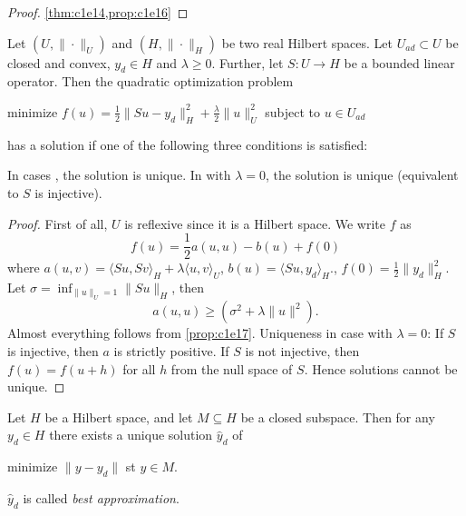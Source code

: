 \documentclass[../skript.tex]{subfiles}
\begin{document}
\begin{proof}
\cref{thm:c1e14,prop:c1e16}
\end{proof}
\begin{theorem} %
\label{thm:c1e18}
Let $(U, \| \cdot \|_U)$ and $(H, \| \cdot \|_H)$ be two real Hilbert spaces. Let $U_{ad} \subset U$ be closed and convex, $y_d \in H$ and $\lambda \geq 0$.
Further, let $S : U \to H$ be a bounded linear operator. Then the quadratic optimization problem\par
\begin{mdframed}[style=theoremframing]
minimize $f(u) = \frac{1}{2} \| Su - y_d \|_H^2 + \frac{\lambda}{2} \| u \|_U^2$ subject to $u \in U_{ad}$
\end{mdframed}
has a solution if one of the following three conditions is satisfied:
In cases ,  the solution is unique. In  with $\lambda = 0$, the solution is unique (equivalent to $S$ is injective).
\end{theorem}
\begin{proof}
First of all, $U$ is reflexive since it is a Hilbert space. We write $f$ as
\[
	f(u) = \frac{1}{2} a(u, u) - b(u) + f(0)
\]
where $a(u, v) = \langle Su, Sv \rangle_H + \lambda \langle u, v \rangle_U$, $b(u) = \langle Su, y_d \rangle_H$., $f(0) = \frac{1}{2} \| y_d \|_H^2$.
Let $\sigma = \inf_{\| u \|_U = 1} \| S u \|_H$, then
\[
	a(u, u) \geq (\sigma^2 + \lambda \| u \|^2).
\]
Almost everything follows from \cref{prop:c1e17}. Uniqueness in case  with $\lambda = 0$: If $S$ is injective, then $a$ is strictly positive. If $S$ is not injective, then $f(u) = f(u + h)$ for all $h$ from the null space of $S$.
Hence solutions cannot be unique.
\end{proof}
\begin{examplenumb} %
\label{ex:c1e19}
Let $H$ be a Hilbert space, and let $M \subseteq H$ be a closed subspace. Then for any $y_d \in H$ there exists a unique solution $\hat{y}_d$ of
\begin{mdframed}[style=theoremframing]
minimize $\| y - y_d \|$ \ac{st} $y \in M$.
\end{mdframed}
$\hat{y}_d$ is called \emph{best approximation}.
\end{examplenumb}
\pagebreak
\end{document}
